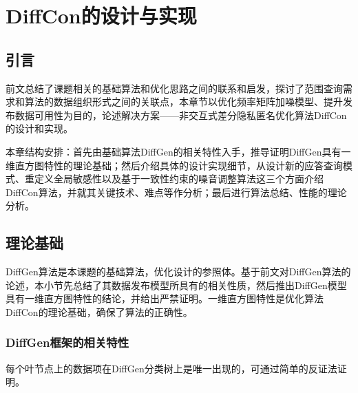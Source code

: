 
\raggedbottom
\chapter{DiffCon的设计与实现}
\label{chap:designandimpl}

\section{引言}

前文总结了课题相关的基础算法和优化思路之间的联系和启发，探讨了范围查询需求和算法的数据组织形式之间的关联点，本章节以优化频率矩阵加噪模型、提升发布数据可用性为目的，论述解决方案——非交互式差分隐私匿名优化算法DiffCon的设计和实现。

本章结构安排：首先由基础算法DiffGen的相关特性入手，推导证明DiffGen具有一维直方图特性的理论基础；然后介绍具体的设计实现细节，从设计新的应答查询模式、重定义全局敏感性以及基于一致性约束的噪音调整算法这三个方面介绍DiffCon算法，并就其关键技术、难点等作分析；最后进行算法总结、性能的理论分析。

\section{理论基础}

DiffGen算法是本课题的基础算法，优化设计的参照体。基于前文对DiffGen算法的论述，本小节先总结了其数据发布模型所具有的相关性质，然后推出DiffGen模型具有一维直方图特性的结论，并给出严禁证明。一维直方图特性是优化算法DiffCon的理论基础，确保了算法的正确性。

\subsection{DiffGen框架的相关特性}

每个叶节点上的数据项在DiffGen分类树上是唯一出现的，可通过简单的反证法证明。
